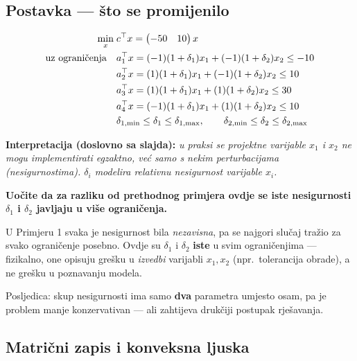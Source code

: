 \subsection{Postavka --- što se promijenilo}

\[
\begin{aligned}
\min_x \; & c\T x = \begin{pmatrix}-50 & 10\end{pmatrix}x \\
\uzogr
& a_1\T x = (-1)(1+\delta_1)x_1 + (-1)(1+\delta_2)x_2 \le -10 \\
& a_2\T x = (1)(1+\delta_1)x_1 + (-1)(1+\delta_2)x_2 \le 10 \\
& a_3\T x = (1)(1+\delta_1)x_1 + (1)(1+\delta_2)x_2 \le 30 \\
& a_4\T x = (-1)(1+\delta_1)x_1 + (1)(1+\delta_2)x_2 \le 10 \\
& \delta_{1,\min} \le \delta_1 \le \delta_{1,\max}, \qquad
  \delta_{2,\min} \le \delta_2 \le \delta_{2,\max}
\end{aligned}
\]

\textbf{Interpretacija (doslovno sa slajda):} \emph{u praksi se projektne
varijable $x_1$ i $x_2$ ne mogu implementirati egzaktno, već samo s nekim
perturbacijama (nesigurnostima). $\delta_i$ modelira relativnu nesigurnost
varijable $x_i$.}

\textbf{Uočite da za razliku od prethodnog primjera ovdje se iste nesigurnosti
$\delta_1$ i $\delta_2$ javljaju u više ograničenja.}

\begin{napomena}
U Primjeru 1 svaka je nesigurnost bila \emph{nezavisna}, pa se najgori slučaj
tražio za svako ograničenje posebno. Ovdje su $\delta_1$ i $\delta_2$
\textbf{iste} u svim ograničenjima --- fizikalno, one opisuju grešku u
\emph{izvedbi} varijabli $x_1, x_2$ (npr.\ tolerancija obrade), a ne grešku u
poznavanju modela.

Posljedica: skup nesigurnosti ima samo \textbf{dva} parametra umjesto osam, pa
je problem manje konzervativan --- ali zahtijeva drukčiji postupak rješavanja.
\end{napomena}

\subsection{Matrični zapis i konveksna ljuska}

